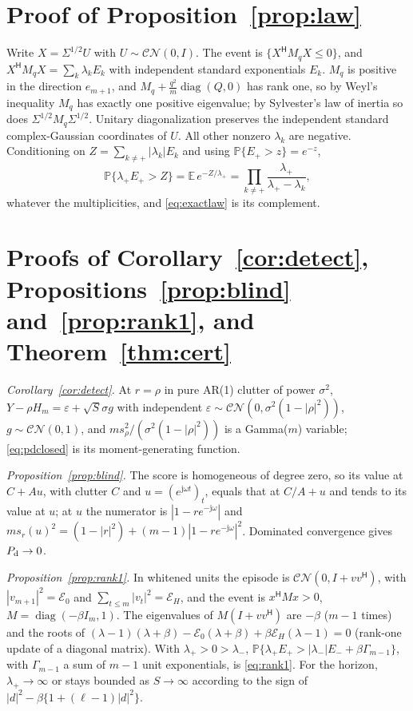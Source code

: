 \documentclass[journal]{IEEEtran}
\newcommand{\PP}{\mathbb{P}}
\begin{document}
\appendices
\section{Proof of Proposition~\ref{prop:law}}\label{app:law}
Write $X=\Sigma^{1/2}U$ with $U\sim\mathcal{CN}(0,I)$. The event is $\{X^{\mathsf H}M_qX\le0\}$, and $X^{\mathsf H}M_qX=\sum_k\lambda_kE_k$ with independent standard exponentials $E_k$. $M_q$ is positive in the direction $e_{m+1}$, and $M_q+\frac{q^2}{m}\operatorname{diag}(Q,0)$ has rank one, so by Weyl's inequality $M_q$ has exactly one positive eigenvalue; by Sylvester's law of inertia so does $\Sigma^{1/2}M_q\Sigma^{1/2}$. Unitary diagonalization preserves the independent standard complex-Gaussian coordinates of $U$. All other nonzero $\lambda_k$ are negative. Conditioning on $Z=\sum_{k\ne+}|\lambda_k|E_k$ and using $\PP\{E_+>z\}=e^{-z}$,
\[
\PP\{\lambda_+E_+>Z\}=\mathbb E\,e^{-Z/\lambda_+}=\prod_{k\ne+}\frac{\lambda_+}{\lambda_+-\lambda_k},
\]
whatever the multiplicities, and \eqref{eq:exactlaw} is its complement.

\section{Proofs of Corollary~\ref{cor:detect}, Propositions~\ref{prop:blind} and~\ref{prop:rank1}, and Theorem~\ref{thm:cert}}\label{app:detect}
\emph{Corollary~\ref{cor:detect}.} At $r=\rho$ in pure AR(1) clutter of power $\sigma^2$, $Y-\rho H_m=\varepsilon+\sqrt S\sigma g$ with independent $\varepsilon\sim\mathcal{CN}(0,\sigma^2(1-|\rho|^2))$, $g\sim\mathcal{CN}(0,1)$, and $ms_\rho^2/(\sigma^2(1-|\rho|^2))$ is a Gamma($m$) variable; \eqref{eq:pdclosed} is its moment-generating function.

\emph{Proposition~\ref{prop:blind}.} The score is homogeneous of degree zero, so its value at $C+Au$, with clutter $C$ and $u=(e^{\mathrm j\omega t})_t$, equals that at $C/A+u$ and tends to its value at $u$; at $u$ the numerator is $|1-re^{-\mathrm j\omega}|$ and $ms_r(u)^2=(1-|r|^2)+(m-1)|1-re^{-\mathrm j\omega}|^2$. Dominated convergence gives $P_{\rm d}\to0$.

\emph{Proposition~\ref{prop:rank1}.} In whitened units the episode is $\mathcal{CN}(0,I+vv^{\mathsf H})$, with $|v_{m+1}|^2=\mathcal E_0$ and $\sum_{t\le m}|v_t|^2=\mathcal E_H$, and the event is $x^{\mathsf H}Mx>0$, $M=\operatorname{diag}(-\beta I_m,1)$. The eigenvalues of $M(I+vv^{\mathsf H})$ are $-\beta$ ($m-1$ times) and the roots of $(\lambda-1)(\lambda+\beta)-\mathcal E_0(\lambda+\beta)+\beta\mathcal E_H(\lambda-1)=0$ (rank-one update of a diagonal matrix). With $\lambda_+>0>\lambda_-$, $\PP\{\lambda_+E_+>|\lambda_-|E_-+\beta\Gamma_{m-1}\}$, with $\Gamma_{m-1}$ a sum of $m-1$ unit exponentials, is \eqref{eq:rank1}. For the horizon, $\lambda_+\to\infty$ or stays bounded as $S\to\infty$ according to the sign of $|d|^2-\beta\{1+(\ell-1)|d|^2\}$.
\end{document}
